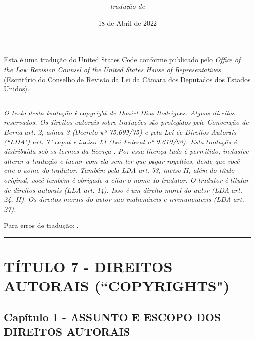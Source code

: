 \documentclass[a4paper, 12pt]{article}
\title{\textbf{\titulo}}
\author{\textit{tradução de}\\\autor}
\date{18 de Abril de 2022}
\begin{document}
\maketitle

Esta é uma tradução do \href{https://uscode.house.gov}{\underline{United States Code}} conforme publicado pelo \textit{Office of the Law Revision Counsel of the United States House of Representatives} (Escritório do Conselho de Revisão da Lei da Câmara dos Deputados dos Estados Unidos).

\begin{center}
\rule{7cm}{0.4pt}
\end{center}

\textit{O texto desta tradução é copyright  de Daniel Dias Rodrigues. Alguns direitos reservados. Os direitos autorais sobre traduções são protegidos pela Convenção de Berna art. 2, alínea 3 (Decreto nº 75.699/75) e pela Lei de Direitos Autorais (``LDA") art. 7º caput e inciso XI (Lei Federal nº 9.610/98). Esta tradução é distribuída sob os termos da licença \href{https://creativecommons.org/licenses/by/4.0/deed.pt_BR}{\underline{}}. Por essa licença tudo é permitido, inclusive alterar a tradução e lucrar com ela sem ter que pagar royalties, desde que você cite o nome do tradutor. Também pela LDA art. 53, inciso II, além do título original, você também é obrigado a citar o nome do tradutor. O tradutor é titular de direitos autorais (LDA art. 14). Isso é um direito moral do autor (LDA art. 24, II). Os direitos morais do autor são inalienáveis e irrenunciáveis (LDA art. 27).}

\vspace{5mm}

Para erros de tradução: \href{mailto:danieldiasr@gmail.com}{\underline{}}.

\begin{center}
\rule{7cm}{0.4pt}
\end{center}

\pagebreak

\tableofcontents

\pagebreak

\section{TÍTULO 7 - DIREITOS AUTORAIS (``COPYRIGHTS")}

\subsection{Capítulo 1 - ASSUNTO E ESCOPO DOS DIREITOS AUTORAIS}
\end{document}
